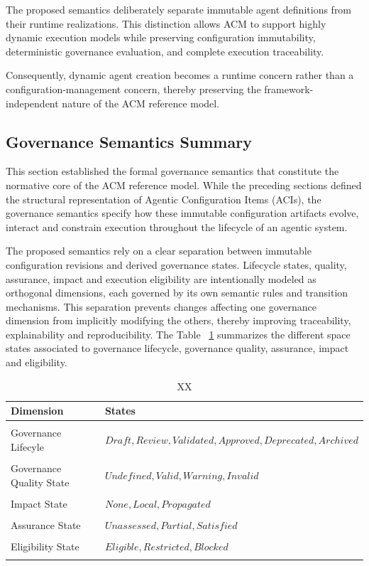 \documentclass[10pt]{article}
\begin{document}
The proposed semantics deliberately separate immutable agent definitions from
their runtime realizations. This distinction allows ACM to support highly
dynamic execution models while preserving configuration immutability,
deterministic governance evaluation, and complete execution traceability.

Consequently, dynamic agent creation becomes a runtime concern rather than a
configuration-management concern, thereby preserving the framework-independent
nature of the ACM reference model.

\subsection{Governance Semantics Summary}
\label{subsec:governance_summary}

This section established the formal governance semantics that constitute the
normative core of the ACM reference model. While the preceding sections defined
the structural representation of Agentic Configuration Items (ACIs), the
governance semantics specify how these immutable configuration artifacts evolve,
interact and constrain execution throughout the lifecycle of an agentic system.

The proposed semantics rely on a clear separation between immutable
configuration revisions and derived governance states. Lifecycle states,
quality, assurance, impact and execution eligibility are intentionally modeled
as orthogonal dimensions, each governed by its own semantic rules and
transition mechanisms. This separation prevents changes affecting one
governance dimension from implicitly modifying the others, thereby improving
traceability, explainability and reproducibility. The Table ~\ref{tab:semantic_space_state} summarizes the different space states associated to governance lifecycle, governance quality, assurance, impact and eligibility.

\begin{table}[t]
	\caption{XX}
	\label{tab:semantic_space_state}
	\centering
	\begin{tabular}{ll}
		\hline
		Dimension & States\\
		\hline
		 & \\
		Governance Lifecyle & $Draft, Review, Validated, Approved, Deprecated,  Archived$ \\
		 & \\
		Governance Quality State & $Undefined, Valid, Warning, Invalid$ \\
		 & \\
		Impact State   & $None, Local, Propagated$ \\
		 & \\
		Assurance State   & $Unassessed, Partial, Satisfied$ \\
		 & \\
		Eligibility State  & $Eligible, Restricted, Blocked$ \\
		 & \\
		\hline
	\end{tabular}
\end{table}
\end{document}
